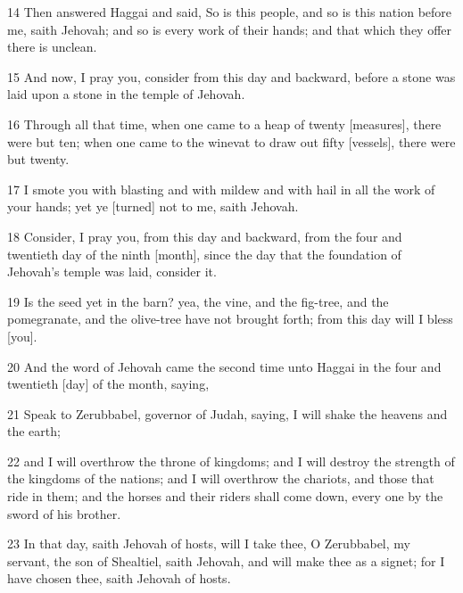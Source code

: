 \par 14 Then answered Haggai and said, So is this people, and so is this nation before me, saith Jehovah; and so is every work of their hands; and that which they offer there is unclean.
\par 15 And now, I pray you, consider from this day and backward, before a stone was laid upon a stone in the temple of Jehovah.
\par 16 Through all that time, when one came to a heap of twenty [measures], there were but ten; when one came to the winevat to draw out fifty [vessels], there were but twenty.
\par 17 I smote you with blasting and with mildew and with hail in all the work of your hands; yet ye [turned] not to me, saith Jehovah.
\par 18 Consider, I pray you, from this day and backward, from the four and twentieth day of the ninth [month], since the day that the foundation of Jehovah's temple was laid, consider it.
\par 19 Is the seed yet in the barn? yea, the vine, and the fig-tree, and the pomegranate, and the olive-tree have not brought forth; from this day will I bless [you].
\par 20 And the word of Jehovah came the second time unto Haggai in the four and twentieth [day] of the month, saying,
\par 21 Speak to Zerubbabel, governor of Judah, saying, I will shake the heavens and the earth;
\par 22 and I will overthrow the throne of kingdoms; and I will destroy the strength of the kingdoms of the nations; and I will overthrow the chariots, and those that ride in them; and the horses and their riders shall come down, every one by the sword of his brother.
\par 23 In that day, saith Jehovah of hosts, will I take thee, O Zerubbabel, my servant, the son of Shealtiel, saith Jehovah, and will make thee as a signet; for I have chosen thee, saith Jehovah of hosts.

